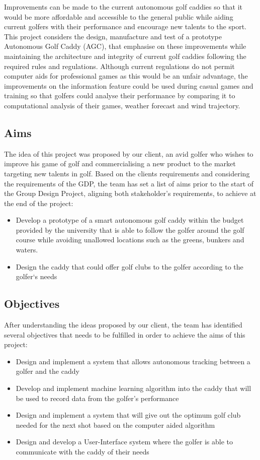 \documentclass[11pt,landscape]{article}
\begin{document}
\begin{multicols}{3}
Improvements can be made to the current autonomous golf caddies so that it would
be more affordable and accessible to the general public while aiding current
golfers with their performance and encourage new talents to the sport. This
project considers the design, manufacture and test of a prototype Autonomous
Golf Caddy (AGC), that emphasise on these improvements while maintaining the
architecture and integrity of current golf caddies following the required rules
and regulations. Although current regulations do not permit computer aids for
professional games as this would be an unfair advantage, the improvements on the
information feature could be used during casual games and training so that
golfers could analyse their performance by comparing it to computational
analysis of their games, weather forecast and wind trajectory.  

\subsection{Aims}
The idea of this project was proposed by our client, an avid golfer who wishes
to improve his game of golf and commercialising a new product to the market
targeting new talents in golf. Based on the clients requirements and considering
the requirements of the GDP, the team has set a list of aims prior to the start
of the Group Design Project, aligning both stakeholder's requirements, to
achieve at the end of the project: 
\begin{itemize}
    \item Develop a prototype of a smart autonomous golf caddy within the budget
    provided by the university that is able to follow the golfer around the golf
    course while avoiding unallowed locations such as the greens, bunkers and
    waters. 
    \item Design the caddy that could offer golf clubs to the golfer according
    to the golfer`s needs 
\end{itemize}

\subsection{Objectives}
After understanding the ideas proposed by our client, the team has identified
several objectives that needs to be fulfilled in order to achieve the aims of
this project: 
\begin{itemize}
    \item Design and implement a system that allows autonomous tracking between
    a golfer and the caddy 
    \item Develop and implement machine learning algorithm into the caddy that
    will be used to record data from the golfer’s performance 
    \item Design and implement a system that will give out the optimum golf club
    needed for the next shot based on the computer aided algorithm 
    \item Design and develop a User-Interface system where the golfer is able to
    communicate with the caddy of their needs 
\end{itemize}


\end{multicols}
\end{document}
